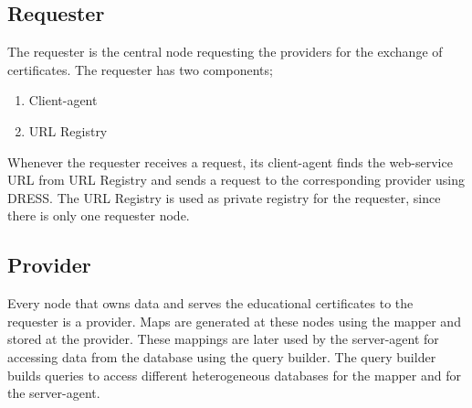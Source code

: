 \documentclass[12pt,a4paper,oneside]{book}
\begin{document}
	\subsection{Requester}
	The requester is the central node requesting the providers for the exchange of certificates. The requester has two components; 

\begin{enumerate}
\item Client-agent
\item URL Registry 
\end{enumerate}

	Whenever the requester receives a request, its client-agent finds the web-service URL from URL Registry and sends a request to the corresponding provider using DRESS. The URL Registry is used as private registry for the requester, since there is only one requester node.  	

		

	\subsection{Provider}
	Every node that owns data and serves the educational certificates to the requester is a provider. Maps are generated at these nodes using the mapper and stored at the provider. These mappings are later used by the server-agent for accessing data from the database using  the query builder. The query builder builds queries to access different heterogeneous databases for the mapper and for the server-agent.



		
		
		
\end{document}
